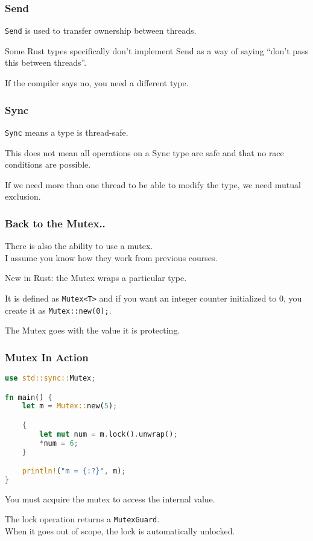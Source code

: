 \begin{frame}
\frametitle{Send}

\texttt{Send} is used to transfer ownership between threads.

Some Rust types specifically don't implement Send as a way of saying ``don't pass this between threads''. 

If the compiler says no, you need a different type.

\end{frame}


\begin{frame}
\frametitle{Sync}

\texttt{Sync} means a type is thread-safe.


This does not mean all operations on a Sync type are safe and that no race conditions are possible.

If we need more than one thread to be able to modify the type, we need mutual exclusion.
\end{frame}


\begin{frame}
\frametitle{Back to the Mutex..}
There is also the ability to use a mutex.\\
\quad I assume you know how they work from previous courses.

New in Rust: the Mutex wraps a particular type.

It is defined as \texttt{Mutex<T>} and if you want an integer counter initialized to 0, you create it as \texttt{Mutex::new(0);}.


The Mutex goes with the value it is protecting.
\end{frame}


\begin{frame}[fragile]
\frametitle{Mutex In Action}

\begin{lstlisting}[language=Rust]
use std::sync::Mutex;

fn main() {
    let m = Mutex::new(5);

    {
        let mut num = m.lock().unwrap();
        *num = 6;
    }

    println!("m = {:?}", m);
}
\end{lstlisting}

You must acquire the mutex to access the internal value.

The lock operation returns a \texttt{MutexGuard}.\\
\quad When it goes out of scope, the lock is automatically unlocked.


\end{frame}


